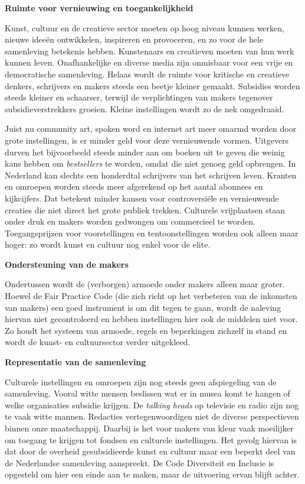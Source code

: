 \textbf{Ruimte voor vernieuwing en toegankelijkheid}

Kunst, cultuur en de creatieve sector moeten op hoog niveau kunnen
werken, nieuwe ideeën ontwikkelen, inspireren en provoceren, en zo voor
de hele samenleving betekenis hebben. Kunstenaars en creatieven moeten
van hun werk kunnen leven. Onafhankelijke en diverse media zijn
onmisbaar voor een vrije en democratische samenleving. Helaas wordt de
ruimte voor kritische en creatieve denkers, schrijvers en makers steeds
een beetje kleiner gemaakt. Subsidies worden steeds kleiner en
schaarser, terwijl de verplichtingen van makers tegenover
subsidieverstrekkers groeien. Kleine instellingen wordt zo de nek
omgedraaid.

Juist nu community art, spoken word en internet art meer omarmd worden
door grote instellingen, is er minder geld voor deze vernieuwende
vormen. Uitgevers durven het bijvoorbeeld steeds minder aan om boeken
uit te geven die weinig kans hebben om \emph{bestsellers} te worden,
omdat die niet genoeg geld opbrengen. In Nederland kan slechts een
honderdtal schrijvers van het schrijven leven. Kranten en omroepen
worden steeds meer afgerekend op het aantal abonnees en kijkcijfers. Dat
betekent minder kansen voor controversiële en vernieuwende creaties die
niet direct het grote publiek trekken. Culturele vrijplaatsen staan
onder druk en makers worden gedwongen om commercieel te worden.
Toegangsprijzen voor voorstellingen en tentoonstellingen worden ook
alleen maar hoger: zo wordt kunst en cultuur nog enkel voor de elite.

\textbf{Ondersteuning van de makers}

Ondertussen wordt de (verborgen) armoede onder makers alleen maar
groter. Hoewel de Fair Practice Code (die zich richt op het verbeteren
van de inkomsten van makers) een goed instrument is om dit tegen te
gaan, wordt de naleving hiervan niet gecontroleerd en hebben
instellingen hier ook de middelen niet voor. Zo houdt het systeem van
armoede, regels en beperkingen zichzelf in stand en wordt de kunst- en
cultuursector verder uitgekleed.

\textbf{Representatie van de samenleving}

Culturele instellingen en omroepen zijn nog steeds geen afspiegeling van
de samenleving. Vooral witte mensen beslissen wat er in musea komt te
hangen of welke organisaties subsidie krijgen. De \emph{talking heads}
op televisie en radio zijn nog te vaak witte mannen. Redacties
vertegenwoordigen niet de diverse perspectieven binnen onze
maatschappij. Daarbij is het voor makers van kleur vaak moeilijker om
toegang te krijgen tot fondsen en culturele instellingen. Het gevolg
hiervan is dat door de overheid gesubsidieerde kunst en cultuur maar een
beperkt deel van de Nederlandse samenleving aanspreekt. De Code
Diversiteit en Inclusie is opgesteld om hier een einde aan te maken,
maar de uitvoering ervan blijft achter.


